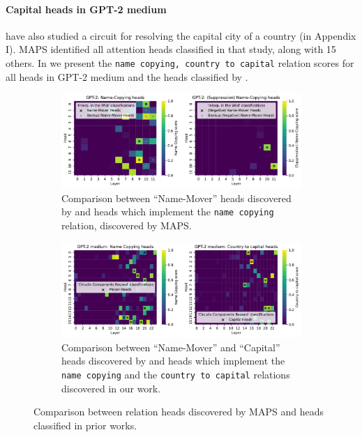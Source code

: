 \documentclass[11pt]{article}
\newcommand{\GPTmedium}{GPT-2 medium}
\newcommand{\framework}{\textsc{MAPS}}
\begin{document}
\paragraph{Capital heads in \GPTmedium{}}
\citet{merullo2024circuit} have also studied a circuit for resolving the capital city of a country (in Appendix I). \framework{} identified all attention heads classified in that study, along with 15 others. 
In  we present the \texttt{name copying, country to capital} relation scores for all heads in \GPTmedium{} and the heads classified by \citet{merullo2024circuit}.


\begin{figure}[htbp]
    \centering
\begin{subfigure}{\textwidth}
    \includegraphics[width=\textwidth]
    {figures/comparison_to_prior/interp_in_the_wild_comparison}
    \caption{Comparison between ``Name-Mover'' heads discovered by \citet{wang2022interpretability} and heads which implement the \texttt{name copying} relation, discovered by \framework{}.}
    \label{fig:interp_in_the_wild_comparison}
\end{subfigure}

\begin{subfigure}{\textwidth}
    \includegraphics[width=\textwidth]
    {figures/comparison_to_prior/circuits_components_reused_comparison}
    \caption{Comparison between ``Name-Mover'' and ``Capital'' heads discovered by \citet{merullo2024circuit} and heads which implement the \texttt{name copying} and the \texttt{country to capital} relations discovered in our work.
    }
    \label{fig:circuits_components_reused_compariso}
\end{subfigure}
\caption{Comparison between relation heads discovered by \framework{} and heads classified in prior works.}
\end{figure}
\end{document}
